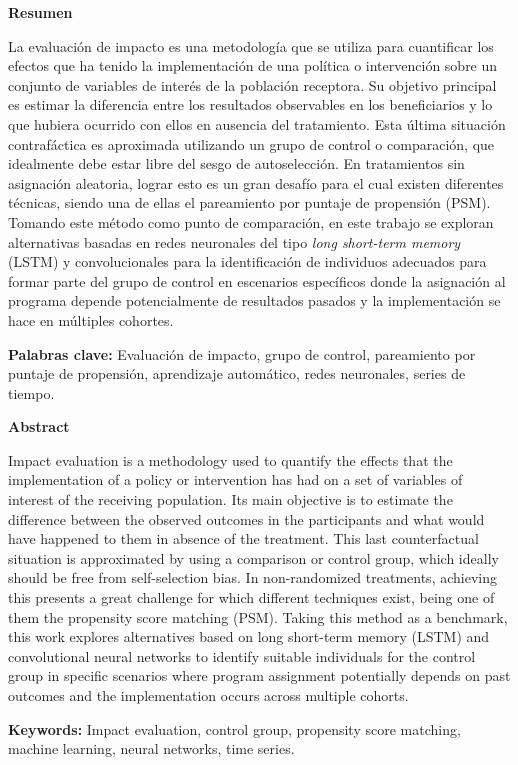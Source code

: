 \documentclass[../main.tex]{subfiles}
\begin{document}
\noindent \textbf{Resumen}

La evaluación de impacto es una metodología que se utiliza para cuantificar los efectos
que ha tenido la implementación de una política o intervención sobre un conjunto de
variables de interés de la población receptora. Su objetivo principal es estimar la
diferencia entre los resultados observables en los beneficiarios y lo que hubiera ocurrido
con ellos en ausencia del tratamiento. Esta última situación contrafáctica es aproximada
utilizando un grupo de control o comparación, que idealmente debe estar libre del sesgo de
autoselección. En tratamientos sin asignación aleatoria, lograr esto es un gran desafío
para el cual existen diferentes técnicas, siendo una de ellas el pareamiento por puntaje
de propensión (PSM). Tomando este método como punto de comparación, en este trabajo se
exploran alternativas basadas en redes neuronales del tipo \textit{long short-term memory}
(LSTM) y convolucionales para la identificación de individuos adecuados para formar parte
del grupo de control en escenarios específicos donde la asignación al programa depende
potencialmente de resultados pasados y la implementación se hace en múltiples cohortes.

\medskip

\noindent \textbf{Palabras clave: } Evaluación de impacto, grupo de control, pareamiento
por puntaje de propensión, aprendizaje automático, redes neuronales, series de tiempo.

\bigskip
\bigskip

\noindent \textbf{Abstract}

Impact evaluation is a methodology used to quantify the effects that the implementation of
a policy or intervention has had on a set of variables of interest of the receiving
population. Its main objective is to estimate the difference between the observed
outcomes in the participants and what would have happened to them in absence of the
treatment. This last counterfactual situation is approximated by using a comparison or
control group, which ideally should be free from self-selection bias. In non-randomized
treatments, achieving this presents a great challenge for which different techniques
exist, being one of them the propensity score matching (PSM). Taking this method as a
benchmark, this work explores alternatives based on long short-term memory (LSTM) and
convolutional neural networks to identify suitable individuals for the control group in
specific scenarios where program assignment potentially depends on past outcomes and the
implementation occurs across multiple cohorts.

\medskip

\noindent \textbf{Keywords: } Impact evaluation, control group, propensity score matching,
machine learning, neural networks, time series.
\end{document}
